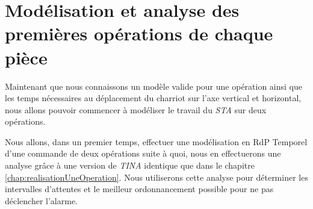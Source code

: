 \chapter{Modélisation et analyse des premières opérations de chaque pièce}
Maintenant que nous connaissons un modèle valide pour une opération ainsi que les temps nécessaires au déplacement du charriot sur l'axe vertical et horizontal, nous allons pouvoir commencer à modéliser le travail du \emph{STA} sur deux opérations.

Nous allons, dans un premier temps, effectuer une modélisation en RdP Temporel d'une commande de deux opérations suite à quoi, nous en effectuerons une analyse grâce à une version de \emph{TINA} identique que dans le chapitre \ref{chap:realisationUneOperation}. Nous utiliserons cette analyse pour déterminer les intervalles d'attentes et le meilleur ordonnancement possible pour ne pas déclencher l'alarme.

